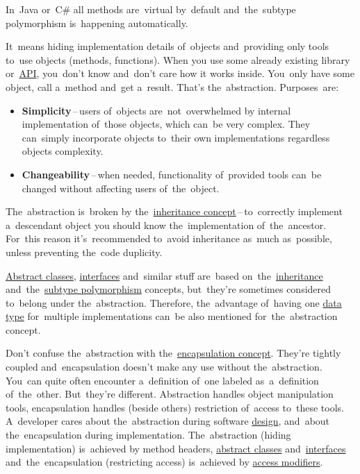 \warning In~Java or~C\# all methods are~virtual by~default and~the~subtype polymorphism is~happening automatically.

\label{abstraction}
It~means hiding implementation details of~objects and~providing only tools to~use objects (methods, functions). When you use some already existing library or~\hyperref[api]{API}, you~don't know and~don't care how it works inside. You~only have some object, call a~method and~get a~result. That's the~abstraction. Purposes~are:
\begin{itemize}
    \item \textbf{Simplicity}\,--\,users of~objects are~not~overwhelmed by internal implementation of~those objects, which can~be very complex. They can~simply incorporate objects to~their own implementations regardless objects complexity.
    \item \textbf{Changeability}\,--\,when needed, functionality of~provided tools can~be changed without affecting users of~the~object.
\end{itemize}

\warning The~abstraction is~broken by the~\hyperref[inheritance]{inheritance concept}\,--\,to~correctly implement a~descendant object you should know the~implementation of~the~ancestor. For~this reason it's~recommended to~avoid inheritance as~much as~possible, unless preventing the~code duplicity.

\warning \hyperref[javaabstractclasses]{Abstract classes}, \hyperref[javainterfaces]{interfaces} and~similar stuff are~based on~the~\hyperref[inheritance]{inheritance} and~the~\hyperref[polymorphism]{subtype polymorphism} concepts, but~they're sometimes considered to~belong under the~abstraction. Therefore, the~advantage of~having one \hyperref[datatypes]{data type} for~multiple implementations can~be also mentioned for~the~abstraction concept.

\warning Don't confuse the~abstraction with the~\hyperref[encapsulation]{encapsulation concept}. They're tightly coupled and~encapsulation doesn't make any use without the~abstraction. You~can quite often encounter a~definition of~one labeled as~a~definition of~the~other. But~they're different. Abstraction handles object manipulation tools, encapsulation handles (beside others) restriction of~access to~these tools. A~developer cares about the~abstraction during software \hyperref[architecturedesign]{design}, and~about the~encapsulation during implementation. The~abstraction (hiding implementation) is~achieved by method headers, \hyperref[javaabstractclasses]{abstract classes} and~\hyperref[javainterfaces]{interfaces} and~the~encapsulation (restricting access) is~achieved by \hyperref[javaaccessmodifiers]{access modifiers}.

